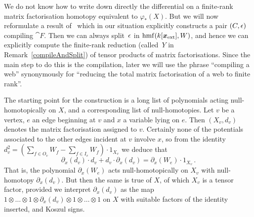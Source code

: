 \documentclass{compositio}
\theoremstyle{definition}
\numberwithin{equation}{section}
\DeclareMathOperator{\hmf}{hmf}
\begin{document}
We do not know how to write down directly the differential on a finite-rank matrix factorisation homotopy equivalent to $\varphi_*(X)$. But we will now reformulate a result of~\cite{dm1102.2957} which in our situation explicitly constructs a pair $(C, \epsilon)$ compiling $\cat{F}$. Then we can always split~$\epsilon$ in $\hmf(k[\extvar],W)$, and hence we can explicitly compute the finite-rank reduction (called~$Y$ in Remark~\ref{compileAndSplit}) of tensor products of matrix factorisations. Since the main step to do this is the compilation, later we will use the phrase ``compiling a web'' synonymously for ``reducing the total matrix factorisation of a web to finite rank''. 

The starting point for the construction is a long list of polynomials acting null-homotopically on $X$, and a corresponding list of null-homotopies. Let $v$ be a vertex, $e$ an edge beginning at $v$ and $x$ a variable lying on $e$. Then $(X_v, d_v)$ denotes the matrix factorisation assigned to $v$. Certainly none of the potentials associated to the other edges incident at $v$ involve $x$, so from the identity $d_v^2 = (\sum_{f \in O_v} W_f - \sum_{f \in I_v} W_f) \cdot 1_{X_v}$ we deduce that
\[
\partial_x(d_v) \cdot d_v + d_v \cdot \partial_x(d_v) = \partial_x(W_e) \cdot 1_{X_v}\,.
\]
That is, the polynomial $\partial_x(W_e)$ acts null-homotopically on $X_v$ with null-homotopy $\partial_x(d_v)$. But then the same is true of $X$, of which $X_v$ is a tensor factor, provided we interpret $\partial_x(d_v)$ as the map $1 \otimes \ldots \otimes 1\otimes \partial_x(d_v) \otimes 1\otimes \ldots \otimes 1$ on $X$ with suitable factors of the identity inserted, and Koszul signs.
\end{document}
